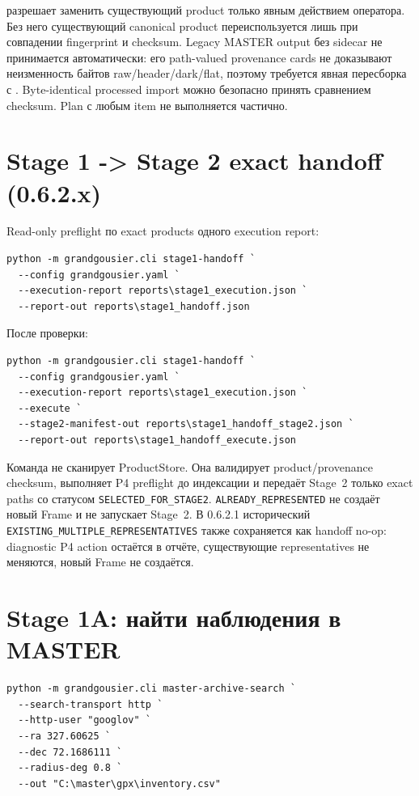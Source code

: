  разрешает заменить существующий product только явным действием оператора. Без него существующий canonical product переиспользуется лишь при совпадении fingerprint и checksum. Legacy MASTER output без sidecar не принимается автоматически: его path-valued provenance cards не доказывают неизменность байтов raw/header/dark/flat, поэтому требуется явная пересборка с . Byte-identical processed import можно безопасно принять сравнением checksum. Plan с любым  item не выполняется частично.

\section{Stage 1 -> Stage 2 exact handoff (0.6.2.x)}

Read-only preflight по exact products одного execution report:

\begin{lstlisting}
python -m grandgousier.cli stage1-handoff `
  --config grandgousier.yaml `
  --execution-report reports\stage1_execution.json `
  --report-out reports\stage1_handoff.json
\end{lstlisting}

После проверки:

\begin{lstlisting}
python -m grandgousier.cli stage1-handoff `
  --config grandgousier.yaml `
  --execution-report reports\stage1_execution.json `
  --execute `
  --stage2-manifest-out reports\stage1_handoff_stage2.json `
  --report-out reports\stage1_handoff_execute.json
\end{lstlisting}

Команда не сканирует ProductStore. Она валидирует product/provenance checksum, выполняет P4 preflight до индексации и передаёт Stage~2 только exact paths со статусом \texttt{SELECTED\_FOR\_STAGE2}. \texttt{ALREADY\_REPRESENTED} не создаёт новый Frame и не запускает Stage~2. В 0.6.2.1 исторический \texttt{EXISTING\_MULTIPLE\_REPRESENTATIVES} также сохраняется как handoff no-op: diagnostic P4 action остаётся в отчёте, существующие representatives не меняются, новый Frame не создаётся.

\section{Stage 1A: найти наблюдения в MASTER}

\begin{lstlisting}
python -m grandgousier.cli master-archive-search `
  --search-transport http `
  --http-user "googlov" `
  --ra 327.60625 `
  --dec 72.1686111 `
  --radius-deg 0.8 `
  --out "C:\master\gpx\inventory.csv"
\end{lstlisting}

